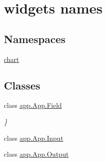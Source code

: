 \hypertarget{group___g_u_i}{}\section{widgets names}
\label{group___g_u_i}
\subsection*{Namespaces}
\begin{DoxyCompactItemize}
\item 
 \hyperlink{namespacechart}{chart}
\end{DoxyCompactItemize}
\subsection*{Classes}
\begin{DoxyCompactItemize}
\item 
class \hyperlink{classapp_1_1_app_1_1_field}{app.\+App.\+Field}
\begin{DoxyCompactList}\small\item\em \} \end{DoxyCompactList}\item 
class \hyperlink{classapp_1_1_app_1_1_input}{app.\+App.\+Input}
\item 
class \hyperlink{classapp_1_1_app_1_1_output}{app.\+App.\+Output}
\end{DoxyCompactItemize}
